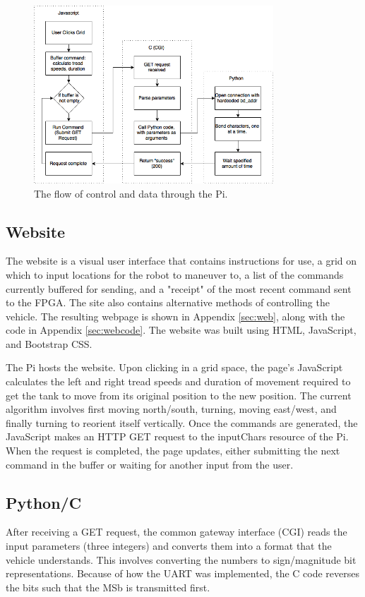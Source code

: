 \documentclass[12pt]{article}
\begin{document}
\begin{figure}
\begin{center}
\includegraphics[width=0.8\textwidth]{PiRoutines}
\end{center}
\caption{The flow of control and data through the Pi.}
\label{fig:piroutines}
\end{figure}

\subsection{Website}

The website is a visual user interface that contains instructions for use, a grid on which to input locations for the robot to maneuver to, a list of the commands currently buffered for sending, and a "receipt" of the most recent command sent to the FPGA. The site also contains alternative methods of controlling the vehicle.  The resulting webpage is shown in Appendix \ref{sec:web}, along with the code in Appendix \ref{sec:webcode}. The website was built using HTML, JavaScript, and Bootstrap CSS. 

The Pi hosts the website. Upon clicking in a grid space, the page's JavaScript calculates the left and right tread speeds and duration of movement required to get the tank to move from its original position to the new position. The current algorithm involves first moving north/south, turning, moving east/west, and finally turning to reorient itself vertically. Once the commands are generated, the JavaScript makes an HTTP GET request to the inputChars resource of the Pi. When the request is completed, the page updates, either submitting the next command in the buffer or waiting for another input from the user.

\subsection{Python/C}
\label{sec:pc}
After receiving a GET request, the common gateway interface (CGI) reads the input parameters (three integers) and converts them into a format that the vehicle understands. This involves converting the numbers to sign/magnitude bit representations. Because of how the UART was implemented, the C code reverses the bits such that the MSb is transmitted first.
\end{document}
